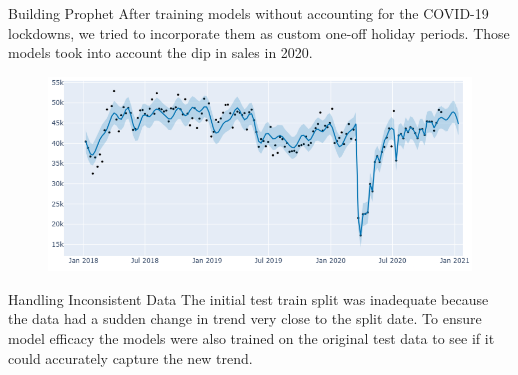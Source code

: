 \documentclass[9pt, dvipsnames]{beamer}
\begin{document}
    \begin{frame}{Building Prophet}
        After training models without accounting for the COVID-19 lockdowns, we tried to incorporate them as 
        custom one-off holiday periods. Those models took into account the dip in sales in 2020.
        \begin{figure}
            \centering
            \includegraphics[height=0.47\paperheight]{assets/Prophet-Weekly.png}
            \label{fig:Prophet-Weekly}
        \end{figure}
    \end{frame}
    \begin{frame}{Handling Inconsistent Data}
        The initial test train split was inadequate because the data had a sudden change in trend very close to
        the split date. To ensure model efficacy the models were also trained on the original test data to 
        see if it could accurately capture the new trend.
    \end{frame}
\end{document}
